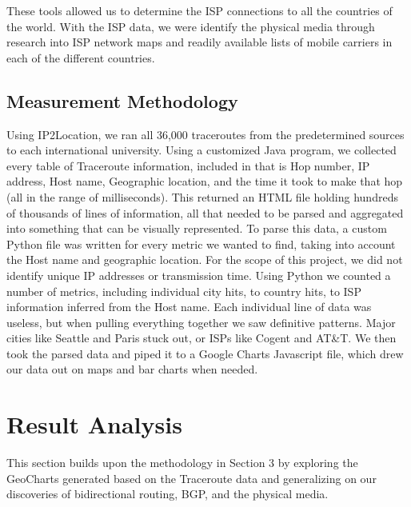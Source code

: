 \documentclass{sigcomm-alternate}
\begin{document}
These tools allowed us to determine the ISP connections to all the countries of the world. With the ISP data, we were identify the physical media through research into ISP network maps and readily available lists of mobile carriers in each of the different countries.
 

\subsection{Measurement Methodology}
Using IP2Location, we ran all 36,000 traceroutes from the predetermined sources to each international university. Using a customized Java program, we collected every table of Traceroute information, included in that is Hop number, IP address, Host name, Geographic location, and the time it took to make that hop (all in the range of milliseconds).  This returned an HTML file holding hundreds of thousands of lines of information, all that needed to be parsed and aggregated into something that can be visually represented. To parse this data, a custom Python file was written for every metric we wanted to find, taking into account the Host name and geographic location. For the scope of this project, we did not identify unique IP addresses or transmission time. Using Python we counted a number of metrics, including individual city hits, to country hits, to ISP information inferred from the Host name. Each individual line of data was useless, but when pulling everything together we saw definitive patterns. Major cities like Seattle and Paris stuck out, or ISPs like Cogent and AT\&T. We then took the parsed data and piped it to a Google Charts Javascript file, which drew our data out on maps and bar charts when needed.


\section{Result Analysis}
This section builds upon the methodology in Section 3 by exploring the GeoCharts generated based on the Traceroute data and generalizing on our discoveries of bidirectional routing, BGP, and the physical media.
 
\end{document}
